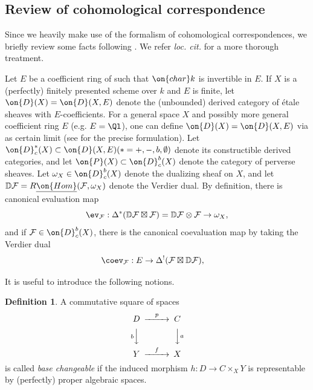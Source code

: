 \documentclass[11pt]{amsart}
\theoremstyle{definition}
\theoremstyle{definition}
\theoremstyle{definition}
\newtheorem{dfn}[thm]{Definition}
\numberwithin{equation}{subsection}
\newcommand{\bD}{{\mathbb D}}
\newcommand{\mF}{{\mathcal F}}
\newcommand{\cha}{{\on{char}}}
\newcommand{\Hom}{{\on{Hom}}}
\begin{document}
\subsection{Review of cohomological correspondence}
\label{Sec:cohomological correspondence}
Since we heavily make use of the formalism of cohomological correspondences, we briefly review some facts following \cite[\S A.2]{XZ}. We refer \emph{loc. cit.} for a more thorough treatment.


Let $E$ be a coefficient ring of such that $\cha k$ is invertible in $E$. 
If $X$ is a (perfectly) finitely presented scheme over $k$ and $E$ is finite, let $\on{D}(X)=\on{D}(X,E)$ denote the (unbounded) derived category of \'etale sheaves with $E$-coefficients. For a general space $X$ and possibly more general coefficient ring $E$ (e.g. $E=\Ql$), one can define $\on{D}(X)=\on{D}(X,E)$ via as certain limit (see \cite[\S A.1.15]{XZ} for the precise formulation).
Let $\on{D}^*_c(X)\subset \on{D}(X,E) (*=+,-,b,\emptyset)$ denote its constructible derived categories, and let $\on{P}(X)\subset\on{D}_c^b(X)$ denote the category of perverse sheaves. Let $\omega_X\in \on{D}_c^b(X)$ denote the dualizing sheaf on $X$, and let $\bD\mF=R\underline{\Hom}(\mF,\omega_X)$ denote the Verdier dual. By definition, there is canonical evaluation map
\begin{equation}
\label{E: VD counit}
 \ev_\mF: \Delta^*(\bD\mF\boxtimes\mF)=\bD\mF\otimes \mF\to \omega_X,
\end{equation}
and if $\mF\in\on{D}_c^b(X)$, there is the canonical coevaluation map by taking the Verdier dual
\begin{equation}
\label{E: VD unit}
\coev_\mF: E\to \Delta^!(\mF\boxtimes\bD\mF),\quad
\end{equation}

It is useful to introduce the following notions. 
\begin{dfn}
\label{D: basechangeable}
A commutative square of spaces 
\begin{equation}
\label{E: basechangeable}
\begin{CD}
D@>p>>C\\
@VbVV@VVaV\\
Y@>f>>X
\end{CD}
\end{equation}
is called \emph{base changeable} if the induced morphism $h:D\to C\times_XY$ is representable by (perfectly) proper algebraic spaces.
\end{dfn}
\end{document}
